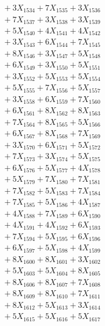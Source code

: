 \documentclass[a4paper,10pt]{article}
\begin{document}
{\begin{align}
&\;  + 3 X_{1534} + 7 X_{1535} + 3 X_{1536} \\[0.3ex]
&\;  + 7 X_{1537} + 3 X_{1538} + 3 X_{1539} \\[0.5ex]\allowbreak
&\;  + 5 X_{1540} + 4 X_{1541} + 4 X_{1542} \\[0.3ex]
&\;  + 3 X_{1543} + 6 X_{1544} + 7 X_{1545} \\[0.3ex]
&\;  + 8 X_{1546} + 3 X_{1547} + 5 X_{1548} \\[0.3ex]
&\;  + 6 X_{1549} + 3 X_{1550} + 5 X_{1551} \\[0.3ex]
&\;  + 3 X_{1552} + 5 X_{1553} + 5 X_{1554} \\[0.3ex]
&\;  + 5 X_{1555} + 7 X_{1556} + 5 X_{1557} \\[0.3ex]
&\;  + 3 X_{1558} + 6 X_{1559} + 7 X_{1560} \\[0.3ex]
&\;  + 6 X_{1561} + 8 X_{1562} + 8 X_{1563} \\[0.3ex]
&\;  + 7 X_{1564} + 8 X_{1565} + 5 X_{1566} \\[0.3ex]
&\;  + 6 X_{1567} + 8 X_{1568} + 7 X_{1569} \\[0.5ex]\allowbreak
&\;  + 3 X_{1570} + 6 X_{1571} + 5 X_{1572} \\[0.3ex]
&\;  + 7 X_{1573} + 3 X_{1574} + 5 X_{1575} \\[0.3ex]
&\;  + 6 X_{1576} + 5 X_{1577} + 4 X_{1578} \\[0.3ex]
&\;  + 5 X_{1579} + 7 X_{1580} + 7 X_{1581} \\[0.3ex]
&\;  + 7 X_{1582} + 5 X_{1583} + 7 X_{1584} \\[0.3ex]
&\;  + 7 X_{1585} + 5 X_{1586} + 4 X_{1587} \\[0.3ex]
&\;  + 4 X_{1588} + 7 X_{1589} + 6 X_{1590} \\[0.3ex]
&\;  + 4 X_{1591} + 4 X_{1592} + 6 X_{1593} \\[0.3ex]
&\;  + 7 X_{1594} + 5 X_{1595} + 6 X_{1596} \\[0.3ex]
&\;  + 6 X_{1597} + 5 X_{1598} + 4 X_{1599} \\[0.5ex]\allowbreak
&\;  + 8 X_{1600} + 8 X_{1601} + 3 X_{1602} \\[0.3ex]
&\;  + 5 X_{1603} + 5 X_{1604} + 8 X_{1605} \\[0.3ex]
&\;  + 8 X_{1606} + 8 X_{1607} + 7 X_{1608} \\[0.3ex]
&\;  + 8 X_{1609} + 8 X_{1610} + 7 X_{1611} \\[0.3ex]
&\;  + 8 X_{1612} + 5 X_{1613} + 3 X_{1614} \\[0.3ex]
&\;  + 5 X_{1615} + 5 X_{1616} + 5 X_{1617} \\[0.3ex]

\end{align}}
\end{document}
